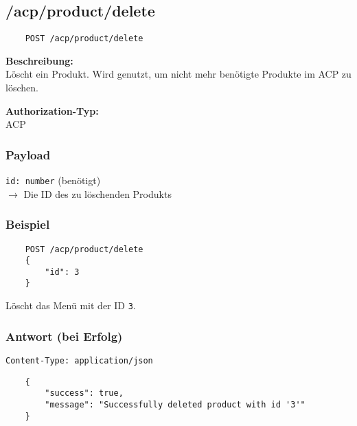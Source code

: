 \subsection{/acp/product/delete}

\begin{lstlisting}
    POST /acp/product/delete
\end{lstlisting}

\textbf{Beschreibung:} \\
Löscht ein Produkt. Wird genutzt, um nicht mehr benötigte Produkte im ACP zu löschen.

\textbf{Authorization-Typ:} \\
ACP

\subsubsection{Payload}

\lstinline{id: number} (benötigt) \\
$\rightarrow$ Die ID des zu löschenden Produkts

\subsubsection{Beispiel}

\begin{lstlisting}
    POST /acp/product/delete
    {
        "id": 3
    }
\end{lstlisting}

Löscht das Menü mit der ID \lstinline{3}.

\subsubsection{Antwort (bei Erfolg)}

\lstinline{Content-Type: application/json}
\begin{lstlisting}
    {
        "success": true, 
        "message": "Successfully deleted product with id '3'"
    }
\end{lstlisting}